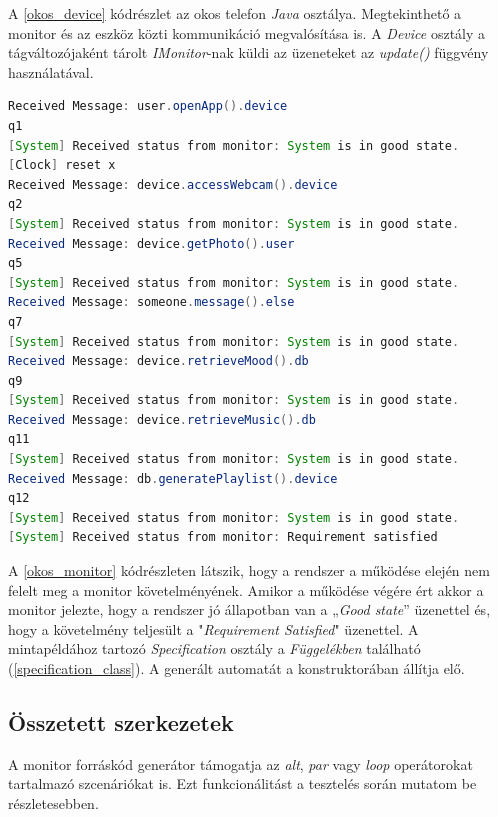 A \ref{okos_device} kódrészlet az okos telefon \textit{Java} osztálya.
Megtekinthető a monitor és az eszköz közti kommunikáció megvalósítása is.
A \textit{Device} osztály a tágváltozójaként tárolt \textit{IMonitor}-nak küldi az üzeneteket az \textit{update()} függvény használatával.

\begin{lstlisting}[language=java, frame=single, float=ht!, caption={Monitor kimenete a rendszer működésének egyes fázisaiban.},captionpos=b,label=okos_monitor]
Received Message: user.openApp().device
q1
[System] Received status from monitor: System is in good state.
[Clock] reset x
Received Message: device.accessWebcam().device
q2
[System] Received status from monitor: System is in good state.
Received Message: device.getPhoto().user
q5
[System] Received status from monitor: System is in good state.
Received Message: someone.message().else
q7
[System] Received status from monitor: System is in good state.
Received Message: device.retrieveMood().db
q9
[System] Received status from monitor: System is in good state.
Received Message: device.retrieveMusic().db
q11
[System] Received status from monitor: System is in good state.
Received Message: db.generatePlaylist().device
q12
[System] Received status from monitor: System is in good state.
[System] Received status from monitor: Requirement satisfied
\end{lstlisting}

A \ref{okos_monitor} kódrészleten látszik, hogy a rendszer a működése elején nem felelt meg a monitor követelményének.
Amikor a működése végére ért akkor a monitor jelezte, hogy a rendszer jó állapotban van a „\textit{Good state}” üzenettel és, hogy a követelmény teljesült a "\textit{Requirement Satisfied}" üzenettel.
A mintapéldához tartozó \textit{Specification} osztály a \textit{Függelékben} található (\ref{specification_class}).
A generált automatát a konstruktorában állítja elő.

\clearpage\subsection{Összetett szerkezetek}

A monitor forráskód generátor támogatja az \textit{alt}, \textit{par} vagy \textit{loop} operátorokat tartalmazó szcenáriókat is.
Ezt funkcionálitást a tesztelés során mutatom be részletesebben.

